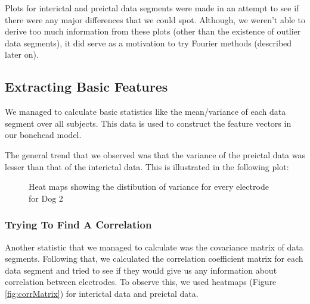 \documentclass[a4paper]{article}
\begin{document}
Plots for interictal and preictal data segments were made in an attempt to see if there were any major differences that we could spot. Although, we weren't able to derive too much information from these plots (other than the existence of outlier data segments), it did serve as a motivation to try Fourier methods (described later on).

\subsection{Extracting Basic Features}
We managed to calculate basic statistics like the mean/variance of each data segment over all subjects. This data is used to construct the feature vectors in our bonehead model.

The general trend that we observed was that the variance of the preictal data was lesser than that of the interictal data. This is illustrated in the following plot:

\begin{figure}[H]
    \centering
    \qquad
    \caption{Heat maps showing the distibution of variance for every electrode for Dog  2}%
    \label{fig:heatvar}%
\end{figure}

\subsubsection{Trying To Find A Correlation}

Another statistic that we managed to calculate was the covariance matrix of data segments. Following that, we calculated the correlation coefficient matrix for each data segment and tried to see if they would give us any information about correlation between electrodes. To observe this, we used heatmaps (Figure \ref{fig:corrMatrix}) for interictal data and preictal data.
\end{document}
